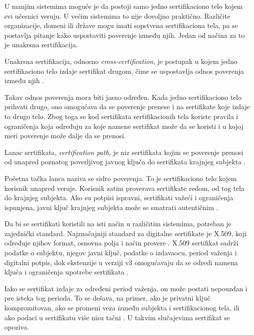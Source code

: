 U manjim sistemima moguće je da postoji samo jedno sertifikaciono telo kojem svi učesnici veruju. U većim sistemima to nije dovoljno praktično. Različite organizacije, domeni ili države mogu imati sopstvena sertifikaciona tela, pa se postavlja pitanje kako uspostaviti poverenje između njih. Jedan od načina za to je unakrsna sertifikacija.

\begin{definition}
Unakrsna sertifikacija, odnosno \emph{cross-certification}, je postupak u kojem jedno sertifikaciono telo izdaje sertifikat drugom, čime se uspostavlja odnos poverenja između njih \cite{rfc5280}.
\end{definition}

Takav odnos poverenja mora biti jasno određen. Kada jedno sertifikaciono telo prihvati drugo, ono omogućava da se poverenje prenese i na sertifikate koje izdaje to drugo telo. Zbog toga se kod sertifikata sertifikacionih tela koriste pravila i ograničenja koja određuju za koje namene sertifikat može da se koristi i u kojoj meri poverenje može dalje da se prenosi.

\begin{definition}
Lanac sertifikata, \emph{certification path}, je niz sertifikata kojim se poverenje prenosi od unapred poznatog poverljivog javnog ključa do sertifikata krajnjeg subjekta \cite{rfc5280}.
\end{definition}

Početna tačka lanca naziva se sidro poverenja. To je sertifikaciono telo kojem korisnik unapred veruje. Korisnik zatim proverava sertifikate redom, od tog tela do krajnjeg subjekta. Ako su potpisi ispravni, sertifikati važeći i ograničenja ispunjena, javni ključ krajnjeg subjekta može se smatrati autentičnim \cite{rfc5280}.

Da bi se sertifikati koristili na isti način u različitim sistemima, potreban je zajednički standard. Najznačajniji standard za digitalne sertifikate je X.509, koji određuje njihov format, osnovna polja i način provere \cite{rfc5280}. X.509 sertifikat sadrži podatke o subjektu, njegov javni ključ, podatke o izdavaocu, period važenja i digitalni potpis, dok ekstenzije u verziji v3 omogućavaju da se odredi namena ključa i ograničenja upotrebe sertifikata \cite{rfc5280}.

Iako se sertifikat izdaje za određeni period važenja, on može postati nepouzdan i pre isteka tog perioda. To se dešava, na primer, ako je privatni ključ kompromitovan, ako se promeni veza između subjekta i sertifikacionog tela, ili ako podaci u sertifikatu više nisu tačni \cite{rfc5280}. U takvim slučajevima sertifikat se opoziva.

